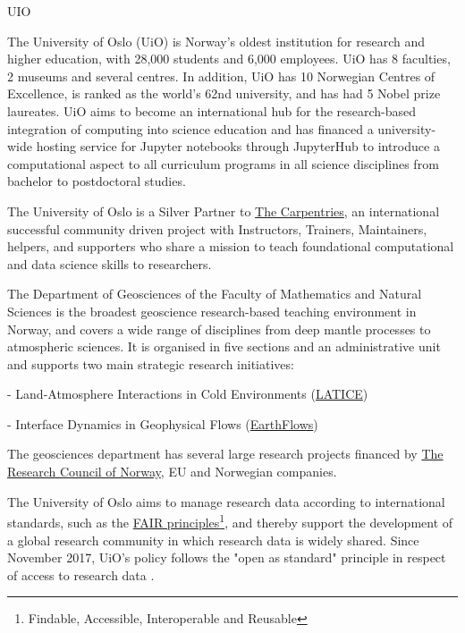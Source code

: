 \begin{sitedescription}{UIO} \label{desc:UIO}

The University of Oslo (UiO) is Norway's oldest institution for research and higher education, with 28,000 students and 6,000 employees. UiO has 8 faculties, 2 museums and several centres. In addition, UiO has 10 Norwegian Centres of Excellence,  is ranked as the world's 62nd university, and has had 5 Nobel prize laureates. UiO aims to become an international hub for the research-based integration of computing into science education and has financed a university-wide hosting service for Jupyter notebooks through JupyterHub  to introduce a computational aspect to all curriculum programs in all science disciplines from bachelor to postdoctoral studies.

The University of Oslo is a Silver Partner to \href{https://carpentries.org}{The Carpentries}, an international successful community driven project with Instructors, Trainers, Maintainers, helpers, and supporters who share a mission to teach foundational computational and data science skills to researchers.

The Department of Geosciences of the Faculty of Mathematics and Natural Sciences is the broadest geoscience research-based teaching environment in Norway, and covers a wide range of disciplines from deep mantle processes to atmospheric sciences. It is organised in five sections and an administrative unit and supports two main strategic research initiatives:

- Land-Atmosphere Interactions in Cold Environments (\href{https://www.mn.uio.no/geo/english/research/groups/latice/}{LATICE})

- Interface Dynamics in Geophysical Flows (\href{https://www.mn.uio.no/geo/english/research/groups/earthflows/}{EarthFlows})


 The geosciences department has several large research projects financed by \href{https://www.forskningsradet.no/en/Home_page/1177315753906}{The Research Council of Norway}, EU and Norwegian companies.

 The University of Oslo aims to manage research data according to international standards, such as the \href{https://www.uio.no/for-ansatte/arbeidsstotte/fa/forskningsdata/fair-data/index.html}{FAIR principles}\footnote{Findable, Accessible, Interoperable and Reusable}, and thereby support the development of a global research community in which research data is widely shared.
 Since November 2017, UiO’s policy follows the "open as standard" principle in respect of access to research data \cite{datapolicy-uio}.


\end{sitedescription}
